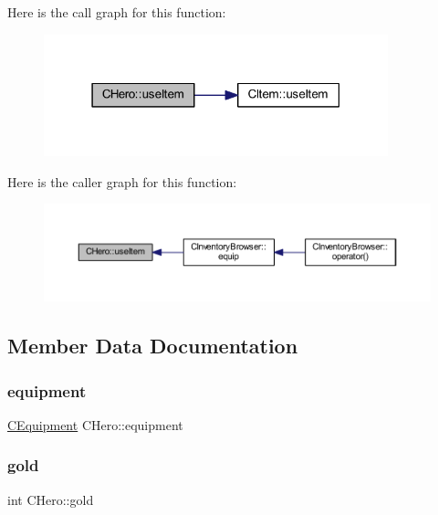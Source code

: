 Here is the call graph for this function\+:\nopagebreak
\begin{figure}[H]
\begin{center}
\leavevmode
\includegraphics[width=283pt]{class_c_hero_ae6ef1be1a9d01855208eeb82292e9f76_cgraph}
\end{center}
\end{figure}
Here is the caller graph for this function\+:\nopagebreak
\begin{figure}[H]
\begin{center}
\leavevmode
\includegraphics[width=350pt]{class_c_hero_ae6ef1be1a9d01855208eeb82292e9f76_icgraph}
\end{center}
\end{figure}


\subsection{Member Data Documentation}
\mbox{\label{class_c_hero_a1d57f797a22e8c02b2e7c3909a75b456}} 
\subsubsection{\texorpdfstring{equipment}{equipment}}
{\footnotesize\ttfamily \mbox{\hyperlink{class_c_equipment}{C\+Equipment}} C\+Hero\+::equipment\hspace{0.3cm}{\ttfamily [protected]}}

\mbox{\label{class_c_hero_acc4cc7eb88f2d67a5920ebabeca7cc46}} 
\subsubsection{\texorpdfstring{gold}{gold}}
{\footnotesize\ttfamily int C\+Hero\+::gold\hspace{0.3cm}{\ttfamily [protected]}}

